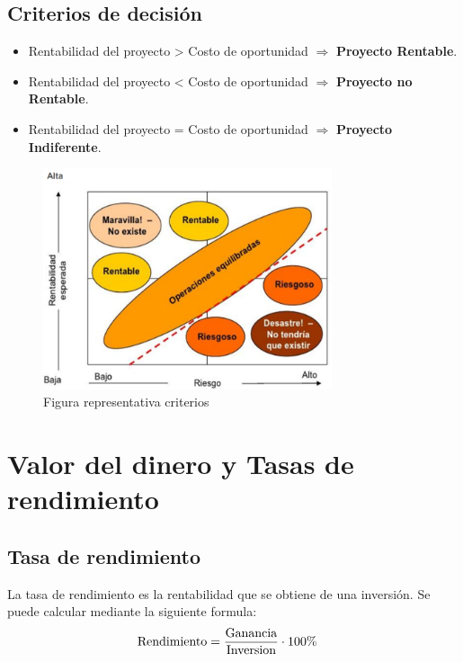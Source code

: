 \documentclass{templateNote}
\begin{document}
\subsection{Criterios de decisión}
\begin{center}
    \begin{itemize}
        \item Rentabilidad del proyecto > Costo de oportunidad $\Rightarrow$ \textbf{Proyecto Rentable}.
        \item Rentabilidad del proyecto < Costo de oportunidad $\Rightarrow$ \textbf{Proyecto no Rentable}.
        \item Rentabilidad del proyecto = Costo de oportunidad $\Rightarrow$ \textbf{Proyecto Indiferente}.
    \end{itemize}        
\end{center}
\begin{figure}[H]
    \centering
    \includegraphics[height=6.5cm]{img/costosOport.png}
    \caption{Figura representativa criterios}
\end{figure}
\newpage

\section{Valor del dinero y Tasas de rendimiento}
\subsection{Tasa de rendimiento}
\noindent La tasa de rendimiento es la rentabilidad que se obtiene de una inversión. Se puede calcular mediante la siguiente formula:
\begin{align*}
    \textnormal{Rendimiento} &= \frac{\textnormal{Ganancia}}{\textnormal{Inversion}} \cdot 100\%
\end{align*}
\end{document}
